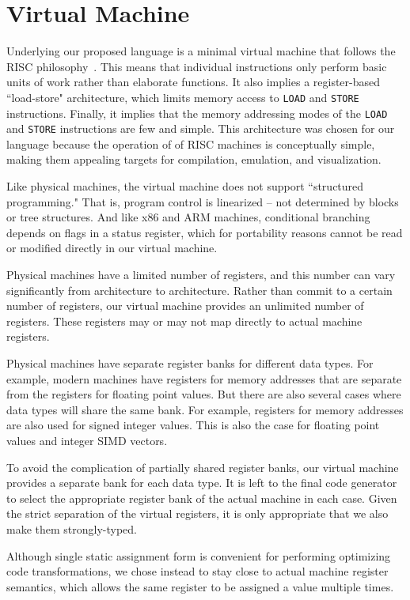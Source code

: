 \section{Virtual Machine}

Underlying our proposed language is a
minimal virtual machine that follows the RISC philosophy~\cite{patterson1985reduced}.
This means that individual instructions only
perform basic units of work rather than elaborate functions.
It also implies a register-based ``load-store" architecture,
which limits memory access to \texttt{LOAD} and \texttt{STORE} instructions.
Finally, it implies that the memory addressing modes of the \texttt{LOAD} and
\texttt{STORE} instructions are few and simple. This architecture was chosen
for our language because the operation of
of RISC machines is conceptually simple, making them
appealing targets for compilation, emulation, and visualization.

Like physical machines, the virtual machine does not support ``structured programming."
That is, program control is linearized -- not determined by blocks
or tree structures. And like x86 and ARM machines, conditional branching
depends on flags in a status register, which for portability reasons
cannot be read or modified directly in our virtual machine.

Physical machines have a limited number of registers, and this number
can vary significantly from architecture to architecture.
Rather than commit to a certain number of registers, our virtual
machine provides an unlimited number of registers. These registers
may or may not map directly to actual machine registers.

Physical machines have separate register banks for different data types.
For example, modern machines have registers for memory addresses
that are separate from the registers for floating point values.
But there are also several cases where data types will share the same bank.
For example, registers for memory addresses are also used for signed integer
values. This is also the case for floating point values and integer SIMD vectors.

To avoid the complication of partially shared register banks,
our virtual machine provides a separate bank for each data type.
It is left to the final code generator to select the
appropriate register bank of the actual machine in each case.
Given the strict separation of the virtual registers,
it is only appropriate that we also make them strongly-typed.

Although single static assignment form is convenient for performing
optimizing code transformations, we chose instead to stay close to actual machine
register semantics, which allows the same register to be assigned a value multiple times.

